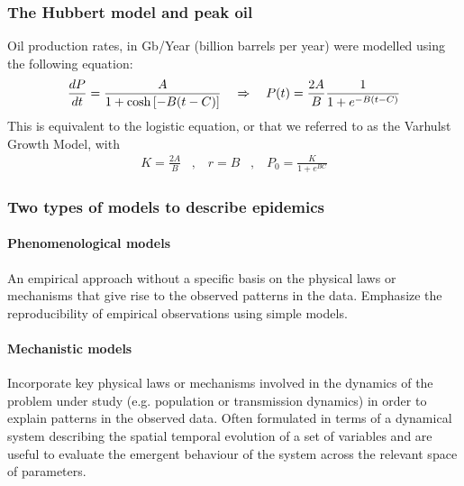 \subsubsection{The Hubbert model and peak oil}

Oil production rates, in Gb/Year (billion barrels per year) were modelled using
the following equation:
\begin{align*}
    \frac{dP}{dt} = \frac{A}{1 + \cosh \left[ -B (t-C) \right]}
    \hspace{10pt} \Rightarrow \hspace{10pt}
    P(t) = \frac{2 A}{B} \frac{1}{1+e^{-B(t-C)}}
\end{align*}
This is equivalent to the logistic equation, or that we referred to as the Varhulst
Growth Model, with
\begin{align*}
    K = \frac{2A}{B}
    \hspace{10pt} , \hspace{10pt}
    r = B
    \hspace{10pt} , \hspace{10pt}
    P_0 = \frac{K}{1 + e^{BC}}
\end{align*}

\subsubsection{Two types of models to describe epidemics}

\paragraph{Phenomenological models}

An empirical approach without a specific basis on the physical laws or mechanisms
that give rise to the observed patterns in the data. Emphasize the reproducibility
of empirical observations using simple models.

\paragraph{Mechanistic models}

Incorporate key physical laws or mechanisms involved in the dynamics of the
problem under study (e.g. population or transmission dynamics) in order
to explain patterns in the observed data. Often formulated in terms of a dynamical
system describing the spatial temporal evolution of a set of variables and are useful
to evaluate the emergent behaviour of the system across the relevant space of parameters.

